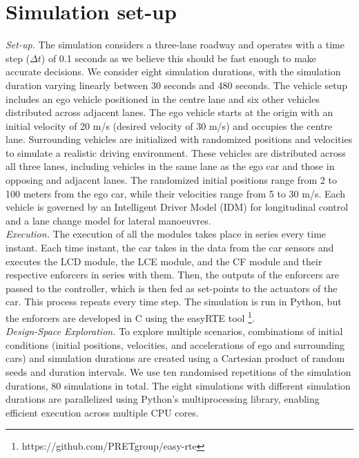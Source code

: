 \section{Simulation set-up}
\label{sec:simulation_setup}
\noindent \textit{Set-up.} The simulation considers a three-lane roadway and operates with a time step ($\Delta t$) of 0.1 seconds as we believe this should be fast enough to make accurate decisions. We consider eight simulation durations, with the simulation duration varying linearly between 30 seconds and 480 seconds. The vehicle setup includes an ego vehicle positioned in the centre lane and six other vehicles distributed across adjacent lanes. The ego vehicle starts at the origin with an initial velocity of 20 m/s (desired velocity of 30 m/s) and occupies the centre lane. Surrounding vehicles are initialized with randomized positions and velocities to simulate a realistic driving environment. 
%
These vehicles are distributed across all three lanes, including vehicles in the same lane as the ego car and those in opposing and adjacent lanes. The randomized initial positions range from 2 to 100 meters from the ego car, while their velocities range from 5 to 30 m/s. Each vehicle is governed by an Intelligent Driver Model (IDM) for longitudinal control and a lane change model for lateral manoeuvres.\\

\noindent \textit{Execution.} The execution of all the modules takes place in series every time instant. Each time instant, the car takes in the data from the car sensors and executes the LCD module, the LCE module, and the CF module and their respective enforcers in series with them. Then, the outputs of the enforcers are passed to the controller, which is then fed as set-points to the actuators of the car. This process repeats every time step. The simulation is run in Python, but the enforcers are developed in C using the easyRTE tool \footnote{https://github.com/PRETgroup/easy-rte}.
\\

\noindent \textit{Design-Space Exploration.} To explore multiple scenarios, combinations of initial conditions (initial positions, velocities, and accelerations of ego and surrounding cars) and simulation durations are created using a Cartesian product of random seeds and duration intervals. We use ten randomised repetitions of the simulation durations, 80 simulations in total. The eight simulations with different simulation durations are parallelized using Python's multiprocessing library, enabling efficient execution across multiple CPU cores. 

